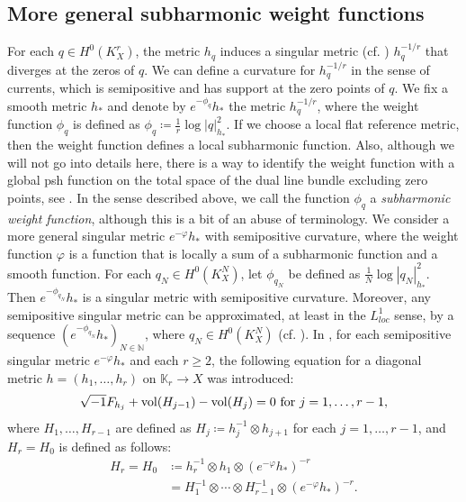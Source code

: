 \documentclass[12pt]{article}
\theoremstyle{definition}
\def\refe{\ast}
\def\vol{{\rm vol}}
\def\N{{\mathbb N}}
\def\K{{\mathbb K}}
\def\inum{{\sqrt{-1}}}
\begin{document}
\subsection{More general subharmonic weight functions}\label{2.2}
For each $q\in H^0(K_X^r)$, the metric $h_q$ induces a singular metric (cf. \cite{GZ1}) $h_q^{-1/r}$ that diverges at the zeros of $q$. We can define a curvature for $h_q^{-1/r}$ in the sense of currents, which is semipositive and has support at the zero points of $q$. We fix a smooth metric $h_\refe$ and denote by $e^{-\phi_q}h_\refe$ the metric $h_q^{-1/r}$, where the weight function $\phi_q$ is defined as $\phi_q\coloneqq \frac{1}{r}\log|q|_{h_\refe}^2$. If we choose a local flat reference metric, then the weight function defines a local subharmonic function. Also, although we will not go into details here, there is a way to identify the weight function with a global psh function on the total space of the dual line bundle excluding zero points, see \cite[Section 2.1]{BB1}. In the sense described above, we call the function $\phi_q$ a {\it subharmonic weight function}, although this is a bit of an abuse of terminology. We consider a more general singular metric $e^{-\varphi}h_\refe$ with semipositive curvature, where the weight function $\varphi$ is a function that is locally a sum of a subharmonic function and a smooth function. For each $q_N\in H^0(K_X^N)$, let $\phi_{q_N}$ be defined as $\frac{1}{N}\log|q_N|_{h_\refe}^2$. Then $e^{-\phi_{q_N}}h_\refe$ is a singular metric with semipositive curvature. Moreover, any semipositive singular metric can be approximated, at least in the $L^1_{loc}$ sense, by a sequence $(e^{-\phi_{q_N}}h_\refe)_{N\in\N}$, where $q_N\in H^0(K_X^N)$ (cf. \cite{GZ1}). In \cite{Miy2, Miy3}, for each semipositive singular metric $e^{-\varphi}h_\refe$ and each $r\geq 2$, the following equation for a diagonal metric $h=(h_1,\dots, h_r)$ on $\K_r\rightarrow X$ was introduced:
\begin{align}
\inum F_{h_j} + \vol(H_{j-1}) - \vol(H_j) = 0 \ \text{for $j=1,\dots, r-1$}, \label{phi}
\end{align}
where $H_1,\dots, H_{r-1}$ are defined as $H_j\coloneqq h_j^{-1}\otimes h_{j+1}$ for each $j=1,\dots, r-1$, and $H_r=H_0$ is defined as follows:
\begin{align*}
H_r = H_0 &\coloneqq h_r^{-1}\otimes h_1 \otimes (e^{-\varphi}h_\refe)^{-r} \\ 
&= H_1^{-1}\otimes \cdots \otimes H_{r-1}^{-1} \otimes (e^{-\varphi}h_\refe)^{-r}.
\end{align*}
\end{document}
